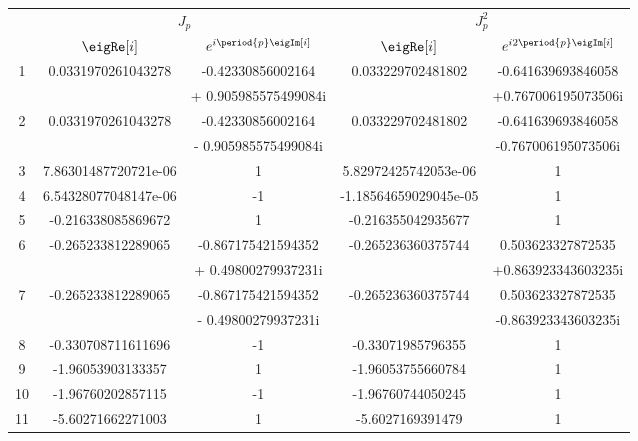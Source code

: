 
		\begin{table}%
        \footnotesize
		\centering
		\begin{tabular}{c | c   c | c  c |}
		   & \multicolumn{2}{|c|}{\large{$J_{p}$}}
               & \multicolumn{2}{|c|}{\large{$J_{p}^{2}$}}\\
		   &  \large{$\eigRe[i]$ }  &\large{$e^{i\period{p}\eigIm[i]}$}  & \large{$\eigRe[i]$}	 & \large{$ e^{i2\period{p}\eigIm[i]}$} \\
		1  & 0.0331970261043278   & -0.42330856002164    & 0.033229702481802     & -0.641639693846058\\
		   & 			  & + 0.905985575499084i & 			 & +0.767006195073506i\\
		2  & 0.0331970261043278   & -0.42330856002164    & 0.033229702481802     & -0.641639693846058\\
		   & 			  & - 0.905985575499084i & 			 & -0.767006195073506i\\
		3  & 7.86301487720721e-06 & 1                    & 5.82972425742053e-06  & 1                      \\
		4  & 6.54328077048147e-06 & -1                   & -1.18564659029045e-05 & 1                      \\
		5  & -0.216338085869672   & 1                    & -0.216355042935677    & 1                      \\
		6  & -0.265233812289065   & -0.867175421594352   & -0.265236360375744    & 0.503623327872535\\
		   & 			  & + 0.49800279937231i  & 			 & +0.863923343603235i \\
		7  & -0.265233812289065   & -0.867175421594352   & -0.265236360375744    & 0.503623327872535\\
		   & 			  & - 0.49800279937231i  & 			 & -0.863923343603235i \\
		8  & -0.330708711611696   & -1                   & -0.33071985796355     & 1                      \\
		9  & -1.96053903133357    & 1                    & -1.96053755660784     & 1                      \\
		10 & -1.96760202857115    & -1                   & -1.96760744050245     & 1                      \\
		11 & -5.60271662271003    & 1                    & -5.6027169391479      & 1                      \\

\end{tabular}
\end{table}
